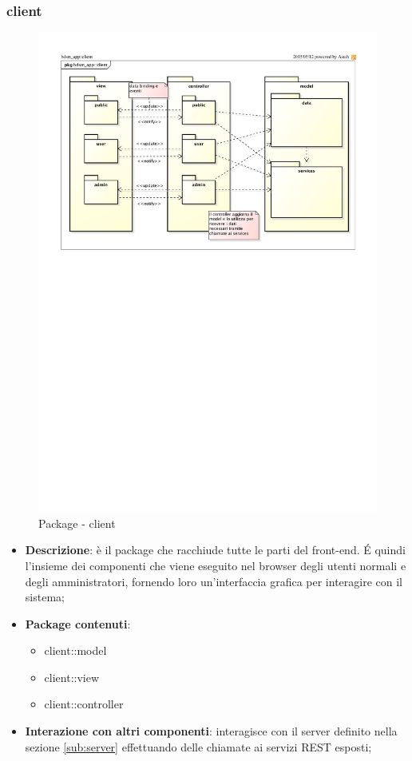 	\subsubsection{client} %
	\label{ssub:bdsm_app_client}
	\begin{figure}[htbp]
		\centering
		\centerline{\includegraphics[scale=0.85]{./images/client/client.pdf}}
		\label{fig:package_client}
		\caption{Package - client}
	\end{figure}

	\begin{itemize}
		\item \textbf{Descrizione}: è il package che racchiude tutte le parti del front-end. \'E quindi l'insieme dei componenti che viene eseguito nel browser degli utenti normali e degli amministratori, fornendo loro un'interfaccia grafica per interagire con il sistema;
		\item \textbf{Package contenuti}:
			\begin{itemize}
				\item client::model
				\item client::view
				\item client::controller
			\end{itemize}
		\item \textbf{Interazione con altri componenti}: interagisce con il server definito nella sezione \ref{sub:server} effettuando delle chiamate ai servizi REST esposti;
	\end{itemize}

